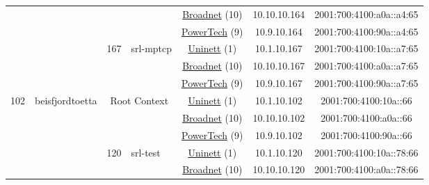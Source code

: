 \begin{small}
\begin{center}
\begin{longtable}{|c|c|c|c|c|c|c|c|}
  &  &  &  & \multicolumn{2}{|c|}{\tiny{\href{https://www.broadnet.no}{Broadnet} (10)}} & \tiny{10.10.10.164} & \tiny{2001:700:4100:a0a::a4:65} \\* \cline{5-5}\cline{6-6}\cline{7-7}\cline{8-8}
  &  &  &  & \multicolumn{2}{|c|}{\tiny{\href{http://www.powertech.no}{PowerTech} (9)}} & \tiny{10.9.10.164} & \tiny{2001:700:4100:90a::a4:65} \\* \cline{3-3}\cline{4-4}\cline{5-5}\cline{6-6}\cline{7-7}\cline{8-8}
  &  & \multirow{3}{*}{\tiny{167}} & \multicolumn{1}{|l|}{\multirow{3}{*}{\tiny{srl-mptcp}}} & \multicolumn{2}{|c|}{\tiny{\href{https://www.uninett.no}{Uninett} (1)}} & \tiny{10.1.10.167} & \tiny{2001:700:4100:10a::a7:65} \\* \cline{5-5}\cline{6-6}\cline{7-7}\cline{8-8}
  &  &  &  & \multicolumn{2}{|c|}{\tiny{\href{https://www.broadnet.no}{Broadnet} (10)}} & \tiny{10.10.10.167} & \tiny{2001:700:4100:a0a::a7:65} \\* \cline{5-5}\cline{6-6}\cline{7-7}\cline{8-8}
  &  &  &  & \multicolumn{2}{|c|}{\tiny{\href{http://www.powertech.no}{PowerTech} (9)}} & \tiny{10.9.10.167} & \tiny{2001:700:4100:90a::a7:65} \\ \hline
 \multirow{30}{*}{\tiny{102}} & \multicolumn{1}{|l|}{\multirow{30}{*}{\tiny{beisfjordtoetta}}} & \multicolumn{2}{|c|}{\multirow{3}{*}{\tiny{Root Context}}} & \multicolumn{2}{|c|}{\tiny{\href{https://www.uninett.no}{Uninett} (1)}} & \tiny{10.1.10.102} & \tiny{2001:700:4100:10a::66} \\* \cline{5-5}\cline{6-6}\cline{7-7}\cline{8-8}
  &  & \multicolumn{2}{|c|}{} & \multicolumn{2}{|c|}{\tiny{\href{https://www.broadnet.no}{Broadnet} (10)}} & \tiny{10.10.10.102} & \tiny{2001:700:4100:a0a::66} \\* \cline{5-5}\cline{6-6}\cline{7-7}\cline{8-8}
  &  & \multicolumn{2}{|c|}{} & \multicolumn{2}{|c|}{\tiny{\href{http://www.powertech.no}{PowerTech} (9)}} & \tiny{10.9.10.102} & \tiny{2001:700:4100:90a::66} \\* \cline{3-3}\cline{4-4}\cline{5-5}\cline{6-6}\cline{7-7}\cline{8-8}
  &  & \multirow{3}{*}{\tiny{120}} & \multicolumn{1}{|l|}{\multirow{3}{*}{\tiny{srl-test}}} & \multicolumn{2}{|c|}{\tiny{\href{https://www.uninett.no}{Uninett} (1)}} & \tiny{10.1.10.120} & \tiny{2001:700:4100:10a::78:66} \\* \cline{5-5}\cline{6-6}\cline{7-7}\cline{8-8}
  &  &  &  & \multicolumn{2}{|c|}{\tiny{\href{https://www.broadnet.no}{Broadnet} (10)}} & \tiny{10.10.10.120} & \tiny{2001:700:4100:a0a::78:66} \\* \cline{5-5}\cline{6-6}\cline{7-7}\cline{8-8}

\end{longtable}
\end{center}
\end{small}
